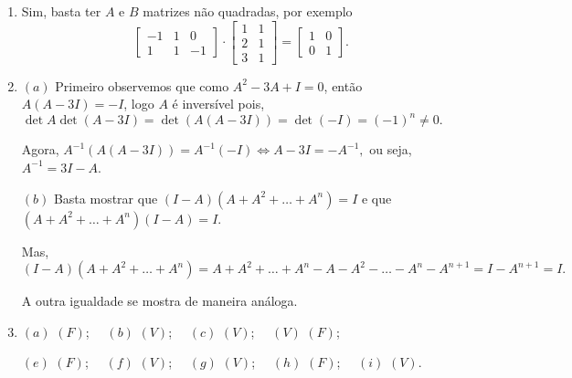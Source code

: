 \documentclass{report}
\begin{document}
\begin{enumerate}

\item Sim, basta ter $A$ e $B$ matrizes não quadradas, por exemplo
$$\left[
\begin{array}{rrr}
-1 & 1 & 0 \\
1 & 1 & -1
\end{array}
\right] \cdot  \left[
\begin{array}{rr}
1 & 1 \\
2 & 1 \\
3 & 1
\end{array}
\right] = \left[
\begin{array}{rr}
1 & 0 \\
0& 1
\end{array}
\right].$$



\item  $( a)$ Primeiro observemos que como $ A^{2}-3A+I=0$, então
    $A(A-3I)=-I$, logo $A$ é inversível pois,
    $\det A \det(A-3I)=\det(A(A-3I))=\det(-I)=(-1)^n \ne 0.$

Agora, $A^{-1}(A(A-3I))=A^{-1}(-I) \Leftrightarrow A- 3I =
-A^{-1},$ ou seja, $A^{-1} = 3I - A$.

$(b)$ Basta mostrar que $(I-A)(A + A^2 + \ldots +A^n) = I$ e que
$(A + A^2 + \ldots +A^n)(I-A) = I$.

Mas, $(I-A)(A + A^2 + \ldots +A^n) = A + A^2 + \ldots +A^n - A -
A^2 - \ldots -A^n-A^{n+1} =I-A^{n+1}=I.$

A outra igualdade se mostra de maneira análoga.


\item  $(a)$ $(F)$; \ \ $(b)$ $(V)$; \ \ $(c)$ $(V)$; \ \ $(V)$
$(F)$;

$(e)$ $(F)$; \ \ $(f)$ $(V)$; \ \ $(g)$ $(V)$; \ \ $(h)$ $(F)$; \
\ $(i)$ $(V)$.





\end{enumerate}
\end{document}
